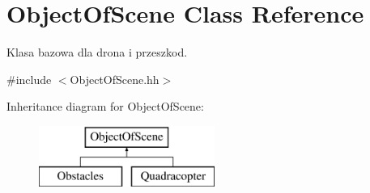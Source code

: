 \hypertarget{class_object_of_scene}{}\section{Object\+Of\+Scene Class Reference}
\label{class_object_of_scene}


Klasa bazowa dla drona i przeszkod.  




{\ttfamily \#include $<$Object\+Of\+Scene.\+hh$>$}

Inheritance diagram for Object\+Of\+Scene\+:\begin{figure}[H]
\begin{center}
\leavevmode
\includegraphics[height=2.000000cm]{class_object_of_scene}
\end{center}
\end{figure}
